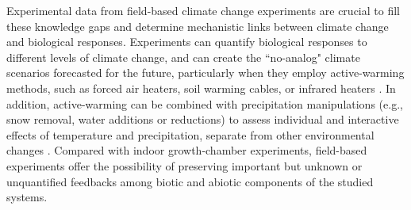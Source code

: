 \documentclass{article}
\begin{document}
\par Experimental data from field-based climate change experiments are crucial to fill these knowledge gaps and determine mechanistic links between climate change and biological responses. Experiments can quantify biological responses to different levels of climate change, and can create the ``no-analog" climate scenarios forecasted for the future, particularly when they employ active-warming methods, such as forced air heaters, soil warming cables, or infrared heaters \citep{shaver2000,williams2007b,aronson2009}. In addition, active-warming can be combined with precipitation manipulations (e.g., snow removal, water additions or reductions) to assess individual and interactive effects of temperature and precipitation, separate from other environmental changes \citep [e.g.,][]{price1998,cleland2006,sherry2007,rollinson2012}. Compared with indoor growth-chamber experiments, field-based experiments offer the possibility of preserving important but unknown or unquantified feedbacks among biotic and abiotic components of the studied systems. %
\end{document}
